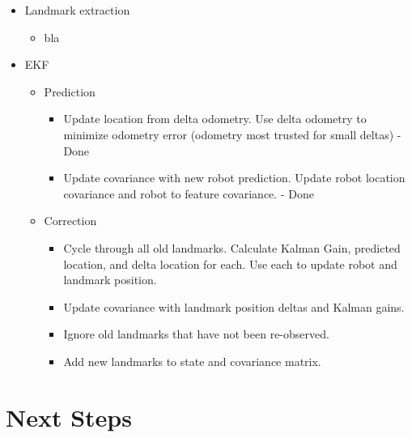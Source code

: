 \documentclass[12pt]{article}
\begin{document}
\begin{itemize}
    \setlength{\itemsep}{0pt}
    \setlength{\parskip}{0pt}
    \setlength{\parsep}{0pt}
    \item Landmark extraction
    \begin{itemize}
        \setlength{\itemsep}{0pt}
        \setlength{\parskip}{0pt}
        \setlength{\parsep}{0pt}
        \item bla
    \end{itemize}
    
    \item EKF
    \begin{itemize}
        \setlength{\itemsep}{0pt}
        \setlength{\parskip}{0pt}
        \setlength{\parsep}{0pt}
        \item Prediction
          \begin{itemize}
            \setlength{\itemsep}{0pt}
            \setlength{\parskip}{0pt}
            \setlength{\parsep}{0pt}
            \item Update location from delta odometry. Use
              delta odometry to minimize odometry error
              (odometry most trusted for small deltas) - Done
            \item Update covariance with new robot prediction. Update
              robot location covariance and robot to feature covariance. - Done
          \end{itemize}
        \item Correction
          \begin{itemize}
            \setlength{\itemsep}{0pt}
            \setlength{\parskip}{0pt}
            \setlength{\parsep}{0pt}
            \item Cycle through all old landmarks. Calculate Kalman Gain,
              predicted location, and delta location for each. Use each
              to update robot and landmark position.
            \item Update covariance with landmark position deltas and Kalman
              gains.
            \item Ignore old landmarks that have not been re-observed.
            \item Add new landmarks to state and covariance matrix.
          \end{itemize}
    \end{itemize}
\end{itemize}

\section{Next Steps}
\end{document}
